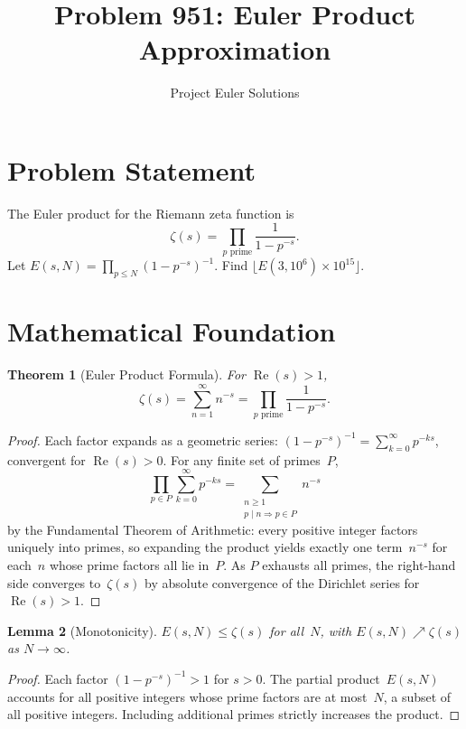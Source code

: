 \documentclass[11pt]{article}
\title{Problem 951: Euler Product Approximation}
\author{Project Euler Solutions}
\date{}
\newtheorem{theorem}{Theorem}
\newtheorem{lemma}[theorem]{Lemma}
\begin{document}
\maketitle

\section{Problem Statement}

The Euler product for the Riemann zeta function is
\[
\zeta(s) = \prod_{p \text{ prime}} \frac{1}{1 - p^{-s}}.
\]
Let $E(s, N) = \prod_{p \le N} (1 - p^{-s})^{-1}$. Find $\lfloor E(3, 10^6) \times 10^{15} \rfloor$.

\section{Mathematical Foundation}

\begin{theorem}[Euler Product Formula]
For $\operatorname{Re}(s) > 1$,
\[
\zeta(s) = \sum_{n=1}^{\infty} n^{-s} = \prod_{p \text{ prime}} \frac{1}{1 - p^{-s}}.
\]
\end{theorem}

\begin{proof}
Each factor expands as a geometric series: $(1-p^{-s})^{-1} = \sum_{k=0}^{\infty} p^{-ks}$, convergent for $\operatorname{Re}(s) > 0$. For any finite set of primes~$P$,
\[
\prod_{p \in P} \sum_{k=0}^{\infty} p^{-ks} = \sum_{\substack{n \ge 1 \\ p \mid n \Rightarrow p \in P}} n^{-s}
\]
by the Fundamental Theorem of Arithmetic: every positive integer factors uniquely into primes, so expanding the product yields exactly one term~$n^{-s}$ for each~$n$ whose prime factors all lie in~$P$. As $P$ exhausts all primes, the right-hand side converges to~$\zeta(s)$ by absolute convergence of the Dirichlet series for $\operatorname{Re}(s) > 1$.
\end{proof}

\begin{lemma}[Monotonicity]
$E(s, N) \le \zeta(s)$ for all~$N$, with $E(s, N) \nearrow \zeta(s)$ as $N \to \infty$.
\end{lemma}

\begin{proof}
Each factor $(1-p^{-s})^{-1} > 1$ for $s > 0$. The partial product~$E(s,N)$ accounts for all positive integers whose prime factors are at most~$N$, a subset of all positive integers. Including additional primes strictly increases the product.
\end{proof}
\end{document}
